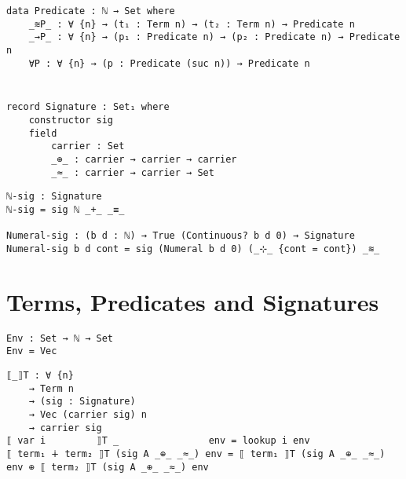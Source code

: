 \documentclass[\main/thesis.tex]{subfiles}
\begin{document}
\begin{lstlisting}
data Predicate : ℕ → Set where
    _≋P_ : ∀ {n} → (t₁ : Term n) → (t₂ : Term n) → Predicate n
    _→P_ : ∀ {n} → (p₁ : Predicate n) → (p₂ : Predicate n) → Predicate n
    ∀P : ∀ {n} → (p : Predicate (suc n)) → Predicate n
\end{lstlisting}

\section{}

\begin{lstlisting}
record Signature : Set₁ where
    constructor sig
    field
        carrier : Set
        _⊕_ : carrier → carrier → carrier
        _≈_ : carrier → carrier → Set
\end{lstlisting}


\begin{lstlisting}
ℕ-sig : Signature
ℕ-sig = sig ℕ _+_ _≡_

Numeral-sig : (b d : ℕ) → True (Continuous? b d 0) → Signature
Numeral-sig b d cont = sig (Numeral b d 0) (_⊹_ {cont = cont}) _≋_
\end{lstlisting}


\section{Terms, Predicates and Signatures}

\begin{lstlisting}
Env : Set → ℕ → Set
Env = Vec
\end{lstlisting}

\begin{lstlisting}
⟦_⟧T : ∀ {n}
    → Term n
    → (sig : Signature)
    → Vec (carrier sig) n
    → carrier sig
⟦ var i         ⟧T _                env = lookup i env
⟦ term₁ ∔ term₂ ⟧T (sig A _⊕_ _≈_) env = ⟦ term₁ ⟧T (sig A _⊕_ _≈_) env ⊕ ⟦ term₂ ⟧T (sig A _⊕_ _≈_) env
\end{lstlisting}

\begin{lstlisting}
\end{lstlisting}
\end{document}
